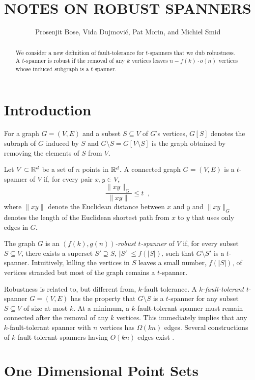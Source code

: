 \documentclass{patmorin}
\title{\MakeUppercase{Notes on Robust Spanners}}
\author{Prosenjit Bose, Vida Dujmovi\'c, Pat Morin, and Michiel Smid}
\begin{document}
\maketitle

\begin{abstract}
We consider a new definition of fault-tolerance for $t$-spanners that
we dub robustness.  A $t$-spanner is robust if the removal of any $k$
vertices leaves $n-f(k)\cdot o(n)$ vertices whose induced subgraph is
a $t$-spanner.
\end{abstract}

\section{Introduction}

For a graph $G=(V,E)$ and a subset $S\subseteq V$ of $G$'s vertices,
$G[S]$ denotes the subraph of $G$ induced by $S$ and $G\setminus
S=G[V\setminus S]$ is the graph obtained by removing the elements of $S$
from $V$.

Let $V\subset \mathbb{R}^d$ be a set of $n$ points in $\mathbb{R}^d$.  A connected graph
$G=(V,E)$ is a $t$-spanner of $V$ if, for every pair $x,y\in V$,
\[
   \frac{\|xy\|_G}{\|xy\|} \le t \enspace ,
\]
where $\|xy\|$ denote the Euclidean distance between $x$ and $y$ and
$\|xy\|_G$ denotes the length of the Euclidean shortest path from $x$ to
$y$ that uses only edges in $G$.

The graph $G$ is an \emph{$(f(k),g(n))$-robust $t$-spanner} of $V$ if,
for every subset $S\subseteq V$, there exists a superset $S'\supseteq
S$, $|S'|\le f(|S|)$, such that $G\setminus S'$ is a $t$-spanner.
Intuitively, killing the vertices in $S$ leaves a small number, $f(|S|)$,
of vertices stranded but most of the graph remains a $t$-spanner.

Robustness is related to, but different from, $k$-fault tolerance.
A \emph{$k$-fault-tolerant} $t$-spanner $G=(V,E)$ has the property that
$G\setminus S$ is a $t$-spanner for any subset $S\subseteq V$ of size
at most $k$.  At a minimum, a $k$-fault-tolerant spanner must remain
connected after the removal of any $k$ vertices.  This immediately implies
that any $k$-fault-tolerant spanner with $n$ vertices has $\Omega(kn)$
edges.  Several constructions of $k$-fault-tolerant spanners having
$O(kn)$ edges exist \cite{A,B,C}.
 

\section{One Dimensional Point Sets}
\end{document}

